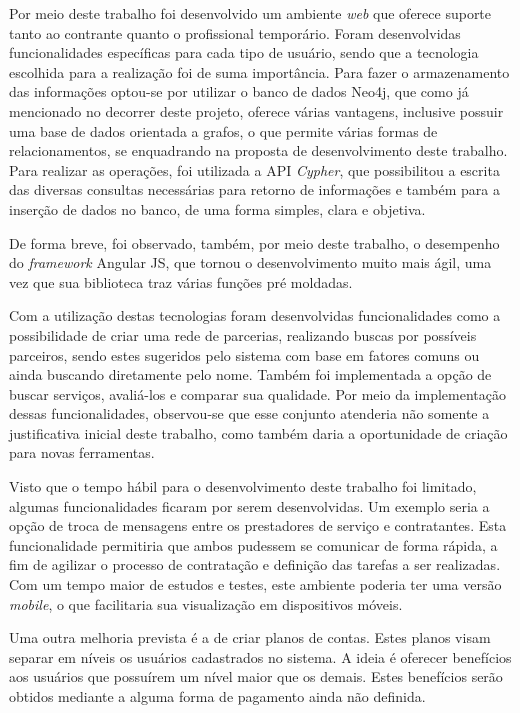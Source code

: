 \par  Por meio deste trabalho foi desenvolvido um ambiente \textit{web} que oferece suporte tanto ao contrante quanto o profissional temporário. Foram desenvolvidas funcionalidades específicas para cada tipo de usuário, sendo que a tecnologia escolhida para a realização foi de suma importância. Para fazer o armazenamento das informações optou-se por utilizar o banco de dados Neo4j, que como já mencionado no decorrer deste projeto, oferece várias vantagens, inclusive possuir uma base de dados orientada a grafos, o que permite várias formas de relacionamentos, se enquadrando na proposta de desenvolvimento deste trabalho. Para realizar as operações, foi utilizada a API \textit{Cypher}, que possibilitou a escrita das diversas consultas necessárias para retorno de informações e também para a inserção de dados no banco, de uma forma simples, clara e objetiva. 

\par De forma breve, foi observado, também, por meio deste trabalho, o desempenho do \textit{framework} Angular JS, que tornou o desenvolvimento muito mais ágil, uma vez que sua biblioteca traz várias funções pré moldadas.

\par Com a utilização destas tecnologias foram desenvolvidas funcionalidades como a possibilidade de criar uma rede de parcerias, realizando buscas por possíveis parceiros, sendo estes sugeridos pelo sistema com base em fatores comuns ou ainda buscando diretamente pelo nome. Também foi implementada a opção de buscar serviços, avaliá-los e comparar sua qualidade. Por meio da implementação dessas funcionalidades, observou-se que esse conjunto  atenderia não somente a justificativa inicial deste trabalho, como também daria a oportunidade de criação para novas ferramentas.

\par Visto que o tempo hábil para o desenvolvimento deste trabalho foi limitado, algumas funcionalidades ficaram por serem desenvolvidas. Um exemplo seria a opção de troca de mensagens entre os prestadores de serviço e contratantes. Esta funcionalidade permitiria que ambos pudessem se comunicar de forma rápida, a fim de agilizar o processo de contratação e definição das tarefas a ser realizadas. Com um tempo maior de estudos e testes, este ambiente poderia ter uma versão \textit{mobile}, o que facilitaria sua visualização em dispositivos móveis. 

\par Uma outra melhoria prevista é a de criar planos de contas. Estes planos visam separar em níveis os usuários cadastrados no sistema. A ideia é oferecer benefícios aos usuários que possuírem um nível maior que os demais. Estes benefícios serão obtidos mediante a alguma forma de pagamento ainda não definida.

